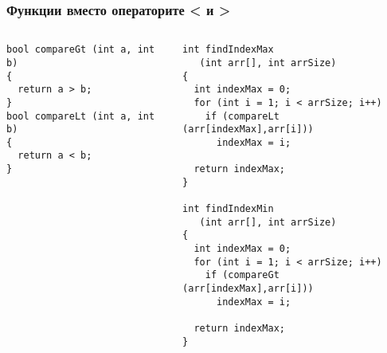 \documentclass{beamer}
\begin{document}
\begin{frame}[fragile]
\frametitle{Функции вместо операторите < и >}

\begin{columns}[t]
  \begin{column}{0.5\textwidth}

\begin{flushleft}
\begin{lstlisting}
bool compareGt (int a, int b)
{
  return a > b;
}
bool compareLt (int a, int b)
{
  return a < b;
}
\end{lstlisting}  
\end{flushleft}

  \end{column}
  \begin{column}{0.5\textwidth}

\begin{flushleft}
\begin{lstlisting}
int findIndexMax  
   (int arr[], int arrSize)
{
  int indexMax = 0;
  for (int i = 1; i < arrSize; i++)
    if (compareLt (arr[indexMax],arr[i]))
      indexMax = i;

  return indexMax;
}

int findIndexMin 
   (int arr[], int arrSize)
{
  int indexMax = 0;
  for (int i = 1; i < arrSize; i++)
    if (compareGt (arr[indexMax],arr[i]))
      indexMax = i;

  return indexMax;
}
\end{lstlisting}  
\end{flushleft}
  \end{column}
\end{columns}

\end{frame}
\end{document}
